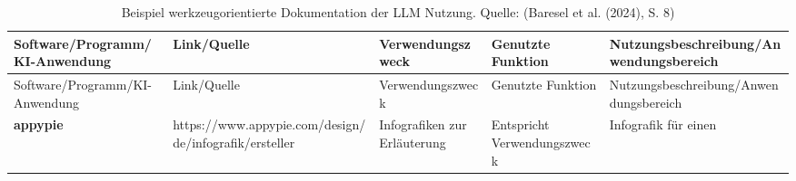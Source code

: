 \documentclass[
  ngerman,
  letterpaper,
  DIV=11]{scrreprt}
\begin{document}
\begin{longtable}[]{@{}
  >{\raggedright\arraybackslash}p{}
  >{\raggedright\arraybackslash}p{}
  >{\raggedright\arraybackslash}p{}
  >{\raggedright\arraybackslash}p{}
  >{\raggedright\arraybackslash}p{}@{}}
\caption{Beispiel werkzeugorientierte Dokumentation der LLM Nutzung.
Quelle: (Baresel et al. (2024), S.
8)}\label{tbl-doc-tools}\tabularnewline
\toprule\noalign{}
\begin{minipage}[b]{\linewidth}\raggedright
Software/Programm/KI-Anwendung
\end{minipage} & \begin{minipage}[b]{\linewidth}\raggedright
Link/Quelle
\end{minipage} & \begin{minipage}[b]{\linewidth}\raggedright
Verwendungszweck
\end{minipage} & \begin{minipage}[b]{\linewidth}\raggedright
Genutzte Funktion
\end{minipage} & \begin{minipage}[b]{\linewidth}\raggedright
Nutzungsbeschreibung/Anwendungsbereich
\end{minipage} \\
\midrule\noalign{}
\endfirsthead
\toprule\noalign{}
\begin{minipage}[b]{\linewidth}\raggedright
Software/Programm/KI-Anwendung
\end{minipage} & \begin{minipage}[b]{\linewidth}\raggedright
Link/Quelle
\end{minipage} & \begin{minipage}[b]{\linewidth}\raggedright
Verwendungszweck
\end{minipage} & \begin{minipage}[b]{\linewidth}\raggedright
Genutzte Funktion
\end{minipage} & \begin{minipage}[b]{\linewidth}\raggedright
Nutzungsbeschreibung/Anwendungsbereich
\end{minipage} \\
\midrule\noalign{}
\endhead
\bottomrule\noalign{}
\endlastfoot
\textbf{appypie} &
https://www.appypie.com/design/de/infografik/ersteller & Infografiken
zur Erläuterung & Entspricht Verwendungszweck & Infografik für einen

\end{longtable}
\end{document}
